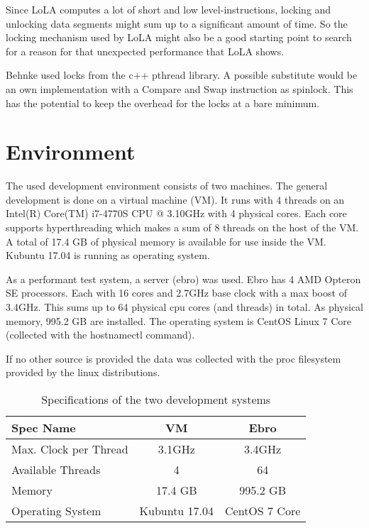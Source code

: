 Since LoLA computes a lot of short and low level-instructions, locking and unlocking data segments might sum up to a significant amount of time. So the locking mechanism used by LoLA might also be a good starting point to search for a reason for that unexpected performance that LoLA shows.

Behnke used locks from the c++ pthread library. A possible substitute would be an own implementation with a Compare and Swap instruction as spinlock. This has the potential to keep the overhead for the locks at a bare minimum.

\section{Environment}
\label{env}
The used development environment consists of two machines. The general development is done on a virtual machine (VM). It runs with 4 threads on an Intel(R) Core(TM) i7-4770S CPU @ 3.10GHz with 4 physical cores. Each core supports hyperthreading which makes a sum of 8 threads on the host of the VM. A total of 17.4 GB of physical memory is available for use inside the VM. Kubuntu 17.04 is running as operating system.

As a performant test system, a server (ebro) was used. Ebro has 4 AMD Opteron SE processors. Each with 16 cores and 2.7GHz base clock with a max boost of 3.4GHz\cite{AMDSpecs}. This sums up to 64 physical cpu cores (and threads) in total. As physical memory, 995.2 GB are installed. The operating system is CentOS Linux 7 Core (collected with the hostnamectl command).

If no other source is provided the data was collected with the proc filesystem provided by the linux distributions.
\begin{center}
    \begin{table}[H]
        \centering
        \begin{tabular}{ | l | c | c |}
            \hline
            \textbf{Spec Name} & \textbf{VM} & \textbf{Ebro} \\ \hline
            Max. Clock per Thread & 3.1GHz & 3.4GHz \\ 
            Available Threads & 4 & 64 \\ 
            Memory & 17.4 GB & 995.2 GB\\ 
            Operating System & Kubuntu 17.04 & CentOS 7 Core \\ \hline
        \end{tabular}
        \caption{Specifications of the two development systems}
    \end{table}
\end{center}


